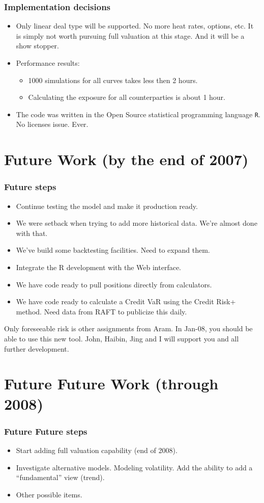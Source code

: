 \documentclass[10pt]{beamer}
\begin{document}
\frame
{
  \frametitle{Implementation decisions}
\begin{itemize}
\item Only linear deal type will be supported.  No more heat rates,
  options, etc.  It is simply not worth pursuing full valuation at
  this stage.  And it will be a show stopper. 
\item Performance results:
\begin{itemize}
  \item 1000 simulations for all curves takes less then 2 hours. 
  \item Calculating the exposure for all counterparties is about 1
    hour. 
\end{itemize}
  \item The code was written in the Open Source statistical 
    programming language {\tt R}.  No licenses issue.  Ever. 
\end{itemize}
}


\section{Future Work (by the end of 2007)}

\frame
{
  \frametitle{Future steps}
\begin{itemize}
\item Continue testing the model and make it production ready. 
\item We were setback when trying to add more historical data.
  We're almost done with that. 
\item We've build some backtesting facilities.  Need to expand them. 
\item Integrate the R development with the Web interface. 
\item We have code ready to pull positions directly from calculators.
\item We have code ready to calculate a Credit VaR using the Credit Risk+
  method.  Need data from RAFT to publicize this daily.  
\end{itemize}
Only foreseeable risk is other assignments from Aram.  In Jan-08, you
should be able to use this new tool. John, Haibin, Jing and I will
support you and all further development. 

}

\section{Future Future Work (through 2008)}

\frame
{
  \frametitle{Future Future steps}
\begin{itemize}
\item Start adding full valuation capability (end of 2008).
\item Investigate alternative models.  Modeling volatility.  Add the
  ability to add a ``fundamental'' view (trend).
\item Other possible items. 
\end{itemize}
}
\end{document}

